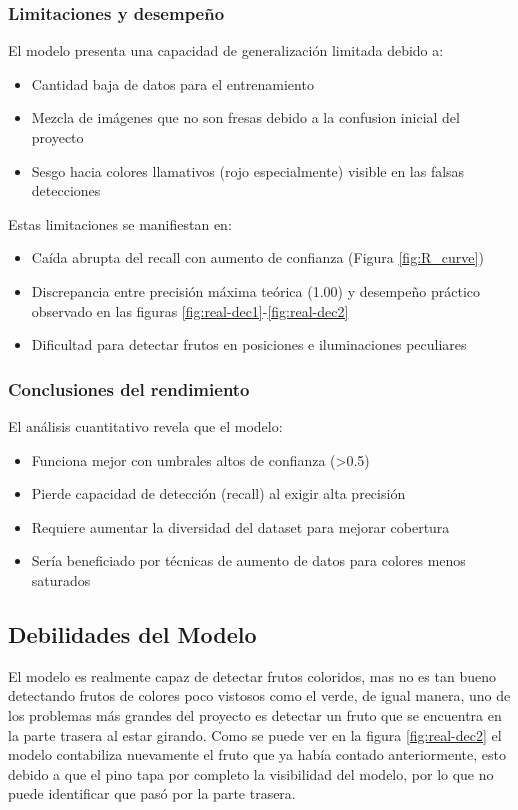 \documentclass[conference]{IEEEtran}
\begin{document}
\subsubsection{Limitaciones y desempeño}
El modelo presenta una capacidad de generalización limitada debido a:
\begin{itemize}
\item Cantidad baja de datos para el entrenamiento
\item Mezcla de imágenes que no son fresas debido a la confusion inicial del proyecto
\item Sesgo hacia colores llamativos (rojo especialmente) visible en las falsas detecciones
\end{itemize}

Estas limitaciones se manifiestan en:
\begin{itemize}
\item Caída abrupta del recall con aumento de confianza (Figura \ref{fig:R_curve})
\item Discrepancia entre precisión máxima teórica (1.00) y desempeño práctico observado en las figuras \ref{fig:real-dec1}-\ref{fig:real-dec2}
\item Dificultad para detectar frutos en posiciones e iluminaciones peculiares
\end{itemize}

\subsubsection{Conclusiones del rendimiento}
El análisis cuantitativo revela que el modelo:
\begin{itemize}
\item Funciona mejor con umbrales altos de confianza (>0.5)
\item Pierde capacidad de detección (recall) al exigir alta precisión
\item Requiere aumentar la diversidad del dataset para mejorar cobertura
\item Sería beneficiado por técnicas de aumento de datos para colores menos saturados
\end{itemize}



\subsection{Debilidades del Modelo}
El modelo es realmente capaz de detectar frutos coloridos, mas no es tan bueno detectando frutos de colores poco vistosos como el verde, de igual manera, uno de los problemas más grandes del proyecto es detectar un fruto que se encuentra en la parte trasera al estar girando. Como se puede ver en la figura \ref{fig:real-dec2} el modelo contabiliza nuevamente el fruto que ya había contado anteriormente, esto debido a que el pino tapa por completo la visibilidad del modelo, por lo que no puede identificar que pasó por la parte trasera.
\end{document}
